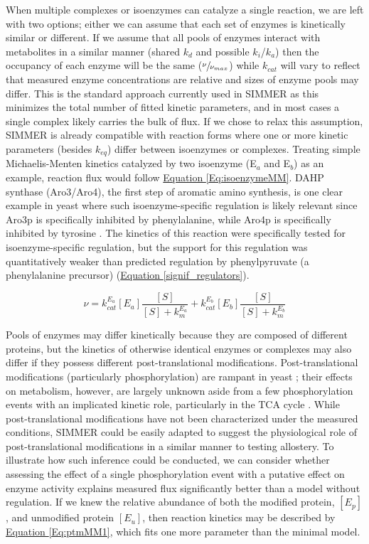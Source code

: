 When multiple complexes or isoenzymes can catalyze a single reaction, we are left with two options; either we can assume that each set of enzymes is kinetically similar or different. If we assume that all pools of enzymes interact with metabolites in a similar manner (shared $k_{d}$ and possible $k_{i}$/$k_{a}$) then the occupancy of each enzyme will be the same ($\sfrac{\nu}{\nu_{max}}$) while $k_{cat}$ will vary to reflect that measured enzyme concentrations are relative and sizes of enzyme pools may differ.  This is the standard approach currently used in SIMMER as this minimizes the total number of fitted kinetic parameters, and in most cases a single complex likely carries the bulk of flux. If we chose to relax this assumption, SIMMER is already  compatible with reaction forms where one or more kinetic parameters (besides $k_{eq}$) differ between isoenzymes or complexes. Treating simple Michaelis-Menten kinetics catalyzed by two isoenzyme (E$_{a}$ and E$_{b}$) as an example, reaction flux would follow \hyperref[Eq:isoenzymeMM]{Equation \ref{Eq:isoenzymeMM}}. DAHP synthase (Aro3/Aro4), the first step of aromatic amino synthesis, is one clear example in yeast where such isoenzyme-specific regulation is likely relevant since Aro3p is specifically inhibited by phenylalanine, while Aro4p is specifically inhibited by tyrosine \cite{Schnappauf:1998ec}. The kinetics of this reaction were specifically tested for isoenzyme-specific regulation, but the support for this regulation was quantitatively weaker than predicted regulation by phenylpyruvate (a phenylalanine precursor) (\hyperref[signif_regulators]{Equation \ref{signif_regulators}}). 

\begin{equation}
\nu = k_{cat}^{E_{a}}\left[E_{a}\right]\frac{\left[S\right]}{\left[S\right] + k_{m}^{E_{a}}} + k_{cat}^{E_{b}}\left[E_{b}\right]\frac{\left[S\right]}{\left[S\right] + k_{m}^{E_{b}}}\label{Eq:isoenzymeMM}
\end{equation}

Pools of enzymes may differ kinetically because they are composed of different proteins, but the kinetics of otherwise identical enzymes or complexes may also differ if they possess different post-translational modifications.  Post-translational modifications (particularly phosphorylation) are rampant in yeast \cite{Fiedler:2009hx}; their effects on metabolism, however, are largely unknown aside from a few phosphorylation events with an implicated kinetic role, particularly in the TCA cycle \cite{Schulz:2014eo}. While post-translational modifications have not been characterized under the measured conditions, SIMMER could be easily adapted to suggest the physiological role of post-translational modifications in a similar manner to testing allostery. To illustrate how such inference could be conducted, we can consider whether assessing the effect of a single phosphorylation event with a putative effect on enzyme activity explains measured flux significantly better than a model without regulation. If we knew the relative abundance of both the modified protein, $\left[E_{p}\right]$, and unmodified protein $\left[E_{u}\right]$, then reaction kinetics may be described by \hyperref[Eq:ptmMM1]{Equation \ref{Eq:ptmMM1}}, which fits one more parameter than the minimal model.

